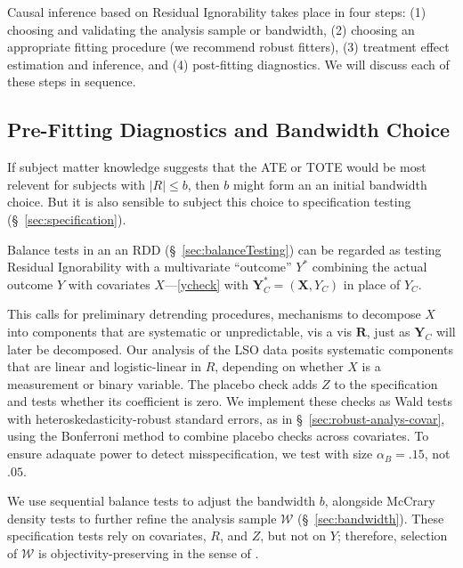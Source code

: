 Causal inference based on Residual Ignorability takes place
in four steps: (1) choosing and validating the analysis sample or
bandwidth, (2) choosing an appropriate fitting procedure (we recommend
robust fitters), (3) treatment effect estimation and inference, and
(4) post-fitting diagnostics.
We will discuss each of these steps in sequence.

\subsection{Pre-Fitting Diagnostics and Bandwidth Choice}
\label{sec:bandwidthChoice}

If subject matter knowledge suggests that the ATE or TOTE would be
most relevent for subjects with $|R|\le b$, then $b$ might form an an
initial bandwidth choice. But it
is also sensible to subject this choice to specification
testing (\S~\ref{sec:specification}).

Balance tests in an an RDD (\S~\ref{sec:balanceTesting})
can be regarded as testing Residual Ignorability with a multivariate
``outcome'' $Y^{*}$ combining the actual outcome $Y$ with covariates $X$---\eqref{ycheck} with
$\mathbf{Y}_{C}^{*} = (\mathbf{X}, {Y}_C)$ in place of $Y_{C}$.

This calls for preliminary detrending procedures, mechanisms to
decompose  $X$ into components that are systematic or unpredictable,
vis a vis $\mathbf{R}$, just as ${\mathbf{Y}_C}$ will later be decomposed.
Our analysis of the LSO data posits systematic components that are
linear and logistic-linear in $R$, depending on whether $X$ is
a measurement or binary variable. %
The placebo check adds $Z$ to the specification and tests whether its
coefficient is zero.  We implement these checks as Wald tests with
heteroskedasticity-robust standard errors, as in
\S~\ref{sec:robust-analys-covar}, using the Bonferroni method to
combine placebo checks across covariates.
To ensure adaquate power to detect misspecification,
we test with size $\alpha_{B}=.15$, not $.05$.

We use sequential balance tests to adjust the bandwidth $b$, alongside
McCrary density tests to further
refine the analysis sample $\mathcal{W}$ (\S~\ref{sec:bandwidth}).
These specification tests rely on covariates, $R$, and $Z$, but not on
$Y$; therefore, selection of $\mathcal{W}$ is objectivity-preserving
in the sense of \citet{rubin2007design}.

